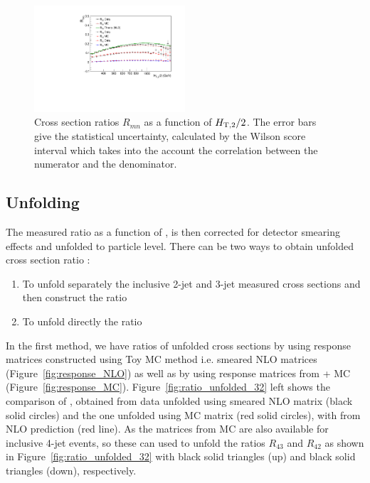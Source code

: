 \begin{figure}[!htbp]
  \begin{center}
    \includegraphics[width=0.5\textwidth]{Plots_HT_2_150/Ratio_32_43_42_all_HT_2_150.pdf}
    \caption{Cross section ratios $R_{mn}$ as a function of $H_{\mathrm{T,2}}/2$. The error bars give the statistical uncertainty, calculated by the Wilson score interval which takes into the account the correlation between the numerator and the denominator.}
    \label{fig:ratio_32}
  \end{center}
\end{figure}

\subsection{Unfolding}
The measured ratio \ratio as a function of \httwo, is then corrected for detector smearing effects and unfolded to particle level. There can be two ways to obtain  unfolded cross section ratio :

\begin{enumerate}
\item To unfold separately the inclusive 2-jet and 3-jet measured cross sections and then construct the ratio \ratio 
\item To unfold directly the ratio \ratio
\end{enumerate}

In the first method, we have ratios of unfolded cross sections by using response matrices constructed using Toy MC method i.e. smeared NLO matrices (Figure~\ref{fig:response_NLO}) as well as by using response matrices from \MadGraphF + \PYTHIAS MC (Figure~\ref{fig:response_MC}). Figure~\ref{fig:ratio_unfolded_32} left shows the comparison of \ratio, obtained from data unfolded using smeared NLO matrix (black solid circles) and the one unfolded using MC matrix (red solid circles), with \ratio from NLO prediction (red line). As the matrices from MC are also available for inclusive 4-jet events, so these can used to unfold the ratios $R_{43}$ and $R_{42}$ as shown in Figure~\ref{fig:ratio_unfolded_32} with black solid triangles (up) and black solid triangles (down), respectively.

